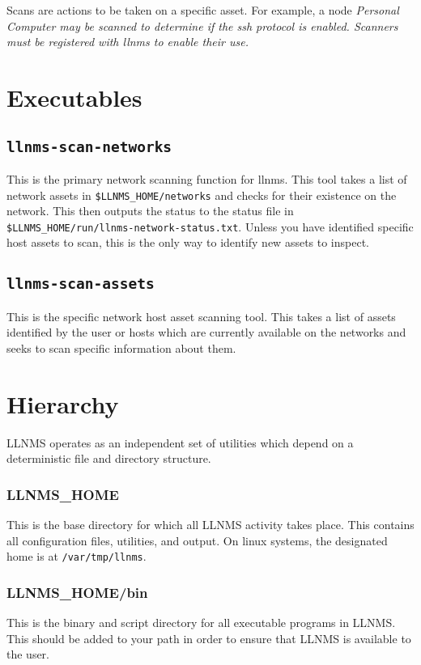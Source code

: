 \documentclass[12pt]{report}
\begin{document}
Scans are actions to be taken on a specific asset.  For example, a node \em{Personal Computer} may be scanned
to determine if the \em{ssh} protocol is enabled.  Scanners must be registered with llnms to enable their use.

\section*{Executables}
\subsection*{\texttt{llnms-scan-networks}}
This is the primary network scanning function for llnms.  This tool takes a list of network assets
in \texttt{\$LLNMS\_HOME/networks} and checks for their existence on the network.  This then outputs the 
status to the status file in \texttt{\$LLNMS\_HOME/run/llnms-network-status.txt}. Unless you have identified
specific host assets to scan, this is the only way to identify new assets to inspect. 

\subsection*{\texttt{llnms-scan-assets}}
This is the specific network host asset scanning tool.  This takes a list of assets identified by the user or
hosts which are currently available on the networks and seeks to scan specific information about them.

\section*{Hierarchy}

LLNMS operates as an independent set of utilities which depend on 
a deterministic file and directory structure. 

\subsubsection*{LLNMS\_HOME}
This is the base directory for which all LLNMS activity takes place.  This
contains all configuration files, utilities, and output.  On linux systems, 
the designated home is at \texttt{/var/tmp/llnms}. 

\subsubsection*{LLNMS\_HOME/bin}
This is the binary and script directory for all executable programs in LLNMS.  This
should be added to your path in order to ensure that LLNMS is available to the user.
\end{document}
